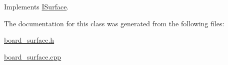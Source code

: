 Implements \mbox{\hyperlink{class_i_surface_ae0b5040cd0eaa1897f61f994f7b2eacf}{I\+Surface}}.



The documentation for this class was generated from the following files\+:\begin{DoxyCompactItemize}
\item 
\mbox{\hyperlink{board__surface_8h}{board\+\_\+surface.\+h}}\item 
\mbox{\hyperlink{board__surface_8cpp}{board\+\_\+surface.\+cpp}}\end{DoxyCompactItemize}
